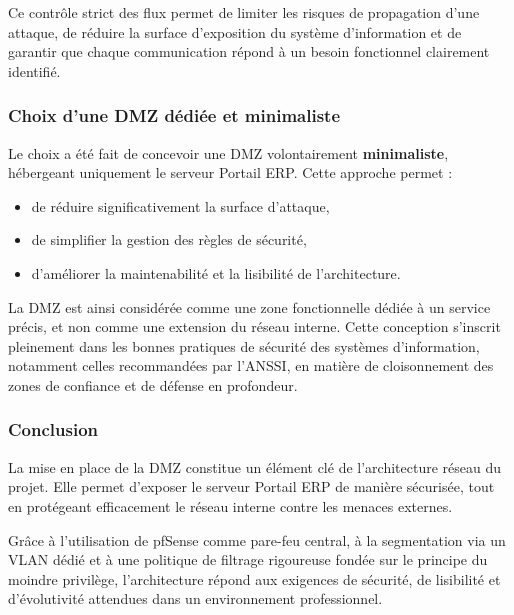 \vspace{0.5cm}

\noindent Ce contrôle strict des flux permet de limiter les risques de propagation d’une attaque, de réduire la surface d’exposition du système d’information et de garantir que chaque communication répond à un besoin fonctionnel clairement identifié.

\subsubsection*{Choix d’une DMZ dédiée et minimaliste}

\noindent Le choix a été fait de concevoir une DMZ volontairement \textbf{minimaliste}, hébergeant uniquement le serveur Portail ERP. Cette approche permet :
\begin{itemize}
    \item de réduire significativement la surface d’attaque,
    \item de simplifier la gestion des règles de sécurité,
    \item d’améliorer la maintenabilité et la lisibilité de l’architecture.
\end{itemize}

\noindent La DMZ est ainsi considérée comme une zone fonctionnelle dédiée à un service précis, et non comme une extension du réseau interne. Cette conception s’inscrit pleinement dans les bonnes pratiques de sécurité des systèmes d’information, notamment celles recommandées par l’ANSSI, en matière de cloisonnement des zones de confiance et de défense en profondeur.

\subsubsection*{Conclusion}

\noindent La mise en place de la DMZ constitue un élément clé de l’architecture réseau du projet. Elle permet d’exposer le serveur Portail ERP de manière sécurisée, tout en protégeant efficacement le réseau interne contre les menaces externes.

\noindent Grâce à l’utilisation de pfSense comme pare-feu central, à la segmentation via un VLAN dédié et à une politique de filtrage rigoureuse fondée sur le principe du moindre privilège, l’architecture répond aux exigences de sécurité, de lisibilité et d’évolutivité attendues dans un environnement professionnel.

\newpage

